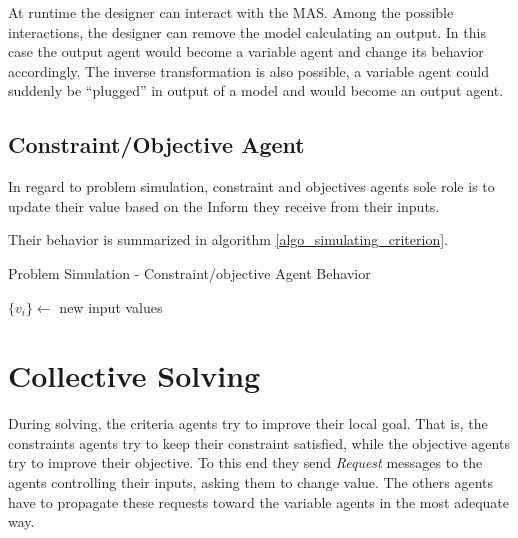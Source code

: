 At runtime the designer can interact with the MAS. Among the possible interactions, the designer can remove the model calculating an output. In this case the output agent would become a variable agent and change its behavior accordingly. The inverse transformation is also possible, a variable agent could suddenly be \enquote{plugged} in output of a model and would become an output agent.

\subsection{Constraint/Objective Agent}

In regard to problem simulation, constraint and objectives agents sole role is to update their value based on the Inform they receive from their inputs.

Their behavior is summarized in algorithm \ref{algo_simulating_criterion}.

\begin{algorithm}
\caption{Problem Simulation - Constraint/objective Agent Behavior}
\label{algo_simulating_criterion}

	$\{v_i\} \leftarrow$ new input values\;
			

\end{algorithm}

\section{Collective Solving}\label{collective_solv}

During solving, the criteria agents try to improve their local goal. That is, the constraints agents try to keep their constraint satisfied, while the objective agents try to improve their objective. To this end they send \emph{Request} messages to the agents controlling their inputs, asking them to change value. The others agents have to propagate these requests toward the variable agents in the most adequate way.

